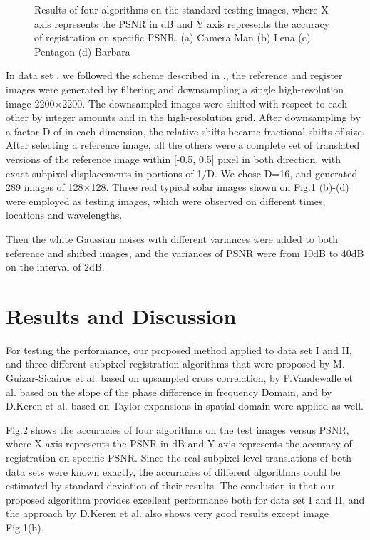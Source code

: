 \documentclass[conference]{IEEEtran}
\begin{document}
{\begin{figure*}[thb]
        \begin{center}
        \caption{Results of four algorithms on the standard testing images, where X axis represents the PSNR in dB and Y axis represents the accuracy of registration on specific PSNR. (a) Camera Man (b) Lena (c) Pentagon (d) Barbara}
        \label{fig:qq}
        \end{center}
\end{figure*}}


In data set \uppercase\expandafter{}, we followed the scheme described in \cite{cit:14},\cite{cit:16}, the reference and register images were generated by filtering and downsampling a single high-resolution image 2200$\times$2200. The downsampled images were shifted with respect to each other by integer amounts and in the high-resolution grid. After downsampling by a factor D of in each dimension, the relative shifts became fractional shifts of size. After selecting a reference image, all the others were a complete set of translated versions of the reference image within [-0.5, 0.5] pixel in both direction, with exact subpixel displacements in portions of 1/D. We chose D=16, and generated 289 images of 128$\times$128. Three real typical solar images shown on Fig.1 (b)-(d) were employed as testing images, which were observed on different times, locations and wavelengths.


Then the white Gaussian noises with different variances were added to both reference and shifted images, and the variances of PSNR were from 10dB to 40dB on the interval of 2dB.
\section{Results and Discussion}
For testing the performance, our proposed method applied to data set I and II, and three different subpixel registration algorithms that were proposed by M. Guizar-Sicairos et al.\cite{cit:5} based on upsampled cross correlation, by P.Vandewalle et al.\cite{cit:11} based on the slope of the phase difference in frequency Domain, and by D.Keren et al.\cite{cit:19} based on Taylor expansions in spatial domain were applied as well.

Fig.2 shows the accuracies of four algorithms on the test images versus PSNR, where X axis represents the PSNR in dB and Y axis represents the accuracy of registration on specific PSNR. Since the real subpixel level translations of both data sets were known exactly, the accuracies of different algorithms could be estimated by standard deviation of their results. The conclusion is that our proposed algorithm provides excellent performance both for data set I and II, and the approach by D.Keren et al. also shows very good results except image Fig.1(b).
\end{document}
